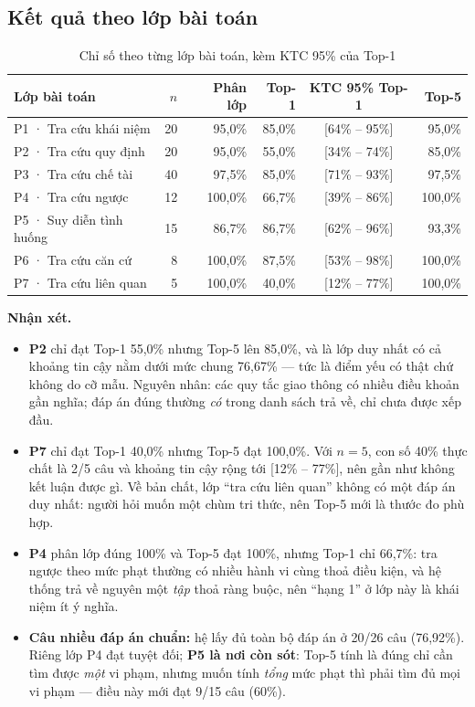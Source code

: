 \subsection{Kết quả theo lớp bài toán}

\begin{table}[H]
\centering
\caption{Chỉ số theo từng lớp bài toán, kèm KTC 95\% của Top-1}
\label{tab:theo-lop}
\renewcommand{\arraystretch}{1.2}
\begin{tabularx}{\textwidth}{@{}L r r r c r@{}}
\toprule
\textbf{Lớp bài toán} & \textbf{$n$} & \textbf{Phân lớp} & \textbf{Top-1} & \textbf{KTC 95\% Top-1} & \textbf{Top-5} \\
\midrule
P1 · Tra cứu khái niệm     & 20 & 95,0\%  & 85,0\% & [64\% -- 95\%] & 95,0\% \\
P2 · Tra cứu quy định      & 20 & 95,0\%  & 55,0\% & [34\% -- 74\%] & 85,0\% \\
P3 · Tra cứu chế tài       & 40 & 97,5\%  & 85,0\% & [71\% -- 93\%] & 97,5\% \\
P4 · Tra cứu ngược         & 12 & 100,0\% & 66,7\% & [39\% -- 86\%] & 100,0\% \\
P5 · Suy diễn tình huống   & 15 & 86,7\%  & 86,7\% & [62\% -- 96\%] & 93,3\% \\
P6 · Tra cứu căn cứ        & 8  & 100,0\% & 87,5\% & [53\% -- 98\%] & 100,0\% \\
P7 · Tra cứu liên quan     & 5  & 100,0\% & 40,0\% & [12\% -- 77\%] & 100,0\% \\
\bottomrule
\end{tabularx}
\end{table}

\textbf{Nhận xét.}
\begin{itemize}
  \item \textbf{P2} chỉ đạt Top-1 55,0\% nhưng Top-5 lên 85,0\%, và là lớp duy nhất có cả
        khoảng tin cậy nằm dưới mức chung 76,67\% --- tức là điểm yếu có thật chứ không do cỡ
        mẫu. Nguyên nhân: các quy tắc giao thông có nhiều điều khoản gần nghĩa; đáp án đúng
        thường \emph{có} trong danh sách trả về, chỉ chưa được xếp đầu.
  \item \textbf{P7} chỉ đạt Top-1 40,0\% nhưng Top-5 đạt 100,0\%. Với $n = 5$, con số 40\%
        thực chất là 2/5 câu và khoảng tin cậy rộng tới [12\% -- 77\%], nên gần như không kết
        luận được gì. Về bản chất, lớp ``tra cứu liên quan'' không có một đáp án duy nhất:
        người hỏi muốn một chùm tri thức, nên Top-5 mới là thước đo phù hợp.
  \item \textbf{P4} phân lớp đúng 100\% và Top-5 đạt 100\%, nhưng Top-1 chỉ 66,7\%: tra ngược
        theo mức phạt thường có nhiều hành vi cùng thoả điều kiện, và hệ thống trả về nguyên
        một \emph{tập} thoả ràng buộc, nên ``hạng 1'' ở lớp này là khái niệm ít ý nghĩa.
  \item \textbf{Câu nhiều đáp án chuẩn:} hệ lấy đủ toàn bộ đáp án ở 20/26 câu (76,92\%).
        Riêng lớp P4 đạt tuyệt đối; \textbf{P5 là nơi còn sót}: Top-5 tính là đúng chỉ cần
        tìm được \emph{một} vi phạm, nhưng muốn tính \emph{tổng} mức phạt thì phải tìm đủ
        mọi vi phạm --- điều này mới đạt 9/15 câu (60\%).
\end{itemize}

